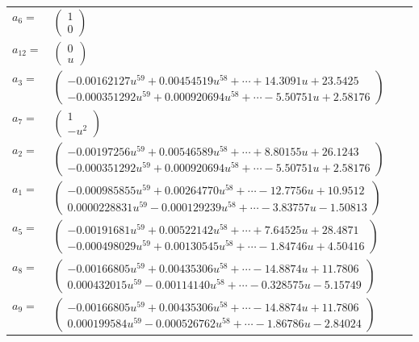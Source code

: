 \documentclass[1p]{elsarticle_modified}
\theoremstyle{definition}
\begin{document}
\begin{tabular}{m{7pt} m{180pt} m{7pt} m{180pt} }
\flushright $a_{6}=$&$\begin{pmatrix}1\\0\end{pmatrix}$ \\
\flushright $a_{12}=$&$\begin{pmatrix}0\\u\end{pmatrix}$ \\
\flushright $a_{3}=$&$\begin{pmatrix}-0.00162127 u^{59}+0.00454519 u^{58}+\cdots+14.3091 u+23.5425\\-0.000351292 u^{59}+0.000920694 u^{58}+\cdots-5.50751 u+2.58176\end{pmatrix}$ \\
\flushright $a_{7}=$&$\begin{pmatrix}1\\- u^2\end{pmatrix}$ \\
\flushright $a_{2}=$&$\begin{pmatrix}-0.00197256 u^{59}+0.00546589 u^{58}+\cdots+8.80155 u+26.1243\\-0.000351292 u^{59}+0.000920694 u^{58}+\cdots-5.50751 u+2.58176\end{pmatrix}$ \\
\flushright $a_{1}=$&$\begin{pmatrix}-0.000985855 u^{59}+0.00264770 u^{58}+\cdots-12.7756 u+10.9512\\0.0000228831 u^{59}-0.000129239 u^{58}+\cdots-3.83757 u-1.50813\end{pmatrix}$ \\
\flushright $a_{5}=$&$\begin{pmatrix}-0.00191681 u^{59}+0.00522142 u^{58}+\cdots+7.64525 u+28.4871\\-0.000498029 u^{59}+0.00130545 u^{58}+\cdots-1.84746 u+4.50416\end{pmatrix}$ \\
\flushright $a_{8}=$&$\begin{pmatrix}-0.00166805 u^{59}+0.00435306 u^{58}+\cdots-14.8874 u+11.7806\\0.000432015 u^{59}-0.00114140 u^{58}+\cdots-0.328575 u-5.15749\end{pmatrix}$ \\
\flushright $a_{9}=$&$\begin{pmatrix}-0.00166805 u^{59}+0.00435306 u^{58}+\cdots-14.8874 u+11.7806\\0.000199584 u^{59}-0.000526762 u^{58}+\cdots-1.86786 u-2.84024\end{pmatrix}$ \\

\end{tabular}
\end{document}
